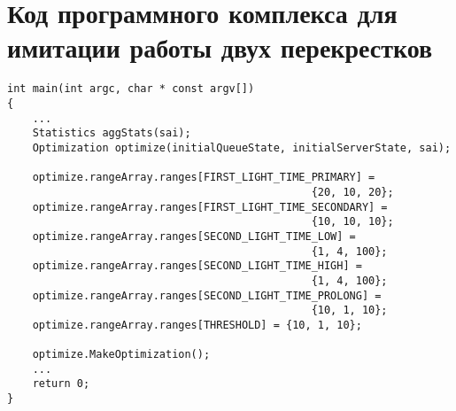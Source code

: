 

\chapter{Код программного комплекса для имитации работы двух перекрестков} \label{AppendixA}

    \begin{lstlisting}[language={[ISO]C++}]
int main(int argc, char * const argv[])
{
    ...
    Statistics aggStats(sai);
    Optimization optimize(initialQueueState, initialServerState, sai);

    optimize.rangeArray.ranges[FIRST_LIGHT_TIME_PRIMARY] = 
                                                {20, 10, 20};
    optimize.rangeArray.ranges[FIRST_LIGHT_TIME_SECONDARY] = 
                                                {10, 10, 10};
    optimize.rangeArray.ranges[SECOND_LIGHT_TIME_LOW] = 
                                                {1, 4, 100};
    optimize.rangeArray.ranges[SECOND_LIGHT_TIME_HIGH] = 
                                                {1, 4, 100};
    optimize.rangeArray.ranges[SECOND_LIGHT_TIME_PROLONG] = 
                                                {10, 1, 10};
    optimize.rangeArray.ranges[THRESHOLD] = {10, 1, 10};
    
    optimize.MakeOptimization();
    ...
    return 0;
}
\end{lstlisting}





